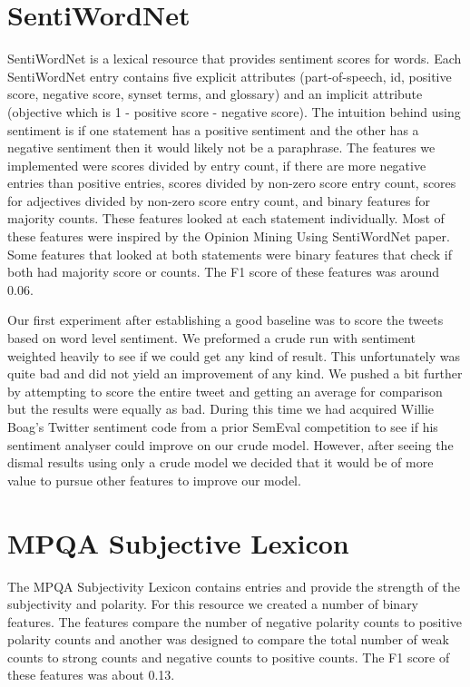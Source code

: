 \documentclass[11pt,letterpaper]{article}
\begin{document}
\section{SentiWordNet}
SentiWordNet is a lexical resource that provides sentiment scores for words. Each SentiWordNet entry contains five explicit attributes (part-of-speech, id, positive score, negative score, synset terms, and glossary) and an implicit attribute (objective which is 1 - positive score - negative score). The intuition behind using sentiment is if one statement has a positive sentiment and the other has a negative sentiment then it would likely not be a paraphrase. The features we implemented were scores divided by entry count, if there are more negative entries than positive entries, scores divided by non-zero score entry count, scores for adjectives divided by non-zero score entry count, and binary features for majority counts. These features looked at each statement individually. Most of these features were inspired by the Opinion Mining Using SentiWordNet paper. Some features that looked at both statements were binary features that check if both had majority score or counts. The F1 score of these features was around 0.06.


Our first experiment after establishing a good baseline was to score the tweets based on word level sentiment. We preformed a crude run with sentiment weighted heavily to see if we could get any kind of result. This unfortunately was quite bad and did not yield an improvement of any kind. We pushed a bit further by attempting to score the entire tweet and getting an average for comparison but the results were equally as bad. During this time we had acquired Willie Boag's Twitter sentiment code from a prior SemEval competition to see if his sentiment analyser could improve on our crude model. However, after seeing the dismal results using only a crude model we decided that it would be of more value to pursue other features to improve our model.

\section{MPQA Subjective Lexicon}
The MPQA Subjectivity Lexicon contains entries and provide the strength of the subjectivity and polarity. For this resource we created a number of binary features. The features compare the number of negative polarity counts to positive polarity counts and another was designed to compare the total number of weak counts to strong counts and negative counts to positive counts. The F1 score of these features was about 0.13.
\end{document}
